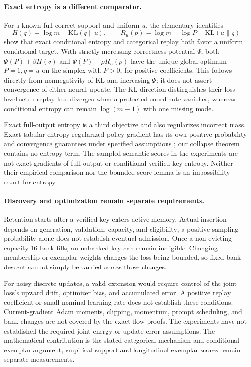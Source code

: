 \documentclass{article}
\newcommand{\1}{\mathbf 1}
\theoremstyle{remark}
\theoremstyle{definition}
\theoremstyle{plain}
\begin{document}
\paragraph{Exact entropy is a different comparator.}
For a known full correct support and uniform $u$, the elementary identities
\[
 H(q)=\log m-\mathrm{KL}(q\|u),\qquad
 R_u(p)=\log m-\log P+\mathrm{KL}(u\|q)
\]
show that exact conditional entropy and categorical replay both favor a
uniform conditional target. With strictly increasing correctness potential
$\Psi$, both $\Psi(P)+\beta H(q)$ and $\Psi(P)-\rho R_u(p)$ have the unique
global optimum $P=1,q=u$ on the simplex with $P>0$, for positive coefficients. This follows directly
from nonnegativity of KL and increasing $\Psi$; it does not assert
convergence of either neural update. The KL direction distinguishes their
loss level sets \citep{pereyra2017confidencepenalty,agarwal2021policygradient}:
replay loss diverges when a protected coordinate vanishes, whereas
conditional entropy can remain $\log(m-1)$ with one missing mode.

Exact full-output entropy is a third objective and also regularizes incorrect
mass. Exact tabular entropy-regularized policy gradient has its own positive
probability and convergence guarantees under specified assumptions
\citep{mei2020softmaxpg}; our collapse theorem contains no entropy term.
The sampled semantic scores in the experiments are not exact gradients of
full-output or conditional verified-key entropy. Neither their empirical
comparison nor the bounded-score lemma is an impossibility result for entropy.

\paragraph{Discovery and optimization remain separate requirements.}
Retention starts after a verified key enters active memory. Actual insertion
depends on generation, validation, capacity, and eligibility; a positive
sampling probability alone does not establish eventual admission. Once a
non-evicting capacity-16 bank fills, an unbanked key can remain ineligible.
Changing membership or exemplar weights changes the loss being bounded, so
fixed-bank descent cannot simply be carried across those changes.

For noisy discrete updates, a valid extension would require control of the
joint loss's upward drift, optimizer bias, and accumulated error. A positive
replay coefficient or small nominal learning rate does not establish these
conditions. Current-gradient Adam moments, clipping, momentum, prompt
scheduling, and bank changes are not covered by the exact-flow proofs.
The experiments have not established the required joint-energy or
update-error assumptions. The mathematical contribution is the stated
categorical mechanism and conditional exemplar argument; empirical support
and longitudinal exemplar scores remain separate measurements.
\end{document}
